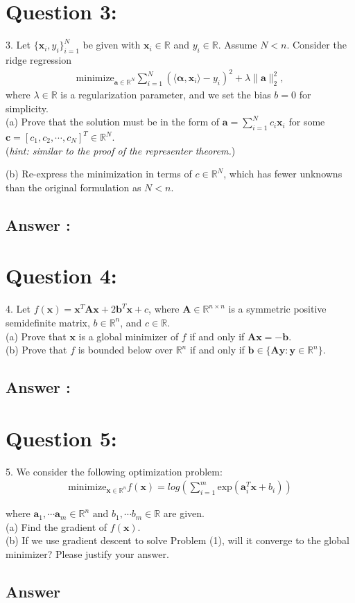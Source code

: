\documentclass[a4paper,12pt]{article}
\newcommand{\R}{\mathbb{R}}
\begin{document}
\section*{Question 3:}
3. Let \(\{\bm{x}_i, y_i\}_{i = 1}^N\) be given with \(\bm{x}_i \in \R\) and \(y_i \in \R\). Assume \(N < n\). Consider the ridge regression
\begin{align*}
    \text{minimize}_{\bm{a}\in\R^N} \sum_{i = 1}^N (\langle \bm{\alpha}, \bm{x}_i\rangle - y_i)^2 + \lambda\|\bm{a}\|_2^2,
\end{align*}
where \(\lambda \in \R\) is a regularization parameter, and we set the bias \(b = 0\) for simplicity. \\

(a) Prove that the solution must be in the form of \(\bm{a} = \sum_{i = 1}^N c_i \bm{x}_i\) for some \(\bm{c} = [c_1, c_2, \cdots, c_N]^T \in \R^N\). \\
(\textit{hint: similar to the proof of the representer theorem.})

(b) Re-express the minimization in terms of \(c \in \R^N\), which has fewer unknowns than the original formulation as \(N < n\).


\subsection*{Answer :}
\section*{Question 4:}
4. Let \(f(\bm{x}) = \bm{x}^T\bm{A}\bm{x} + 2\bm{b}^T\bm{x} + c\), where \(\bm{A} \in \R^{n \times n}\) is a symmetric positive semidefinite matrix, \(b \in \R^n\), and \(c \in \R\). \\
(a) Prove that \(\bm{x}\) is a global minimizer of \(f\) if and only if \(\bm{A}\bm{x} = -\bm{b}\). \\
(b) Prove that \(f\) is bounded below over \(\R^n\) if and only if \(\bm{b} \in \{\bm{A}\bm{y}: \bm{y} \in \R^n\}\). \\
\subsection*{Answer :}

\section*{Question 5:}
5. We consider the following optimization problem:
\begin{align}
    \text{minimize}_{\bm{x} \in \R^n} f(\bm{x}) = log\left( \sum_{i = 1}^m \text{exp}(\bm{a}_i^T \bm{x} + b_i)\right)
\end{align}

where \(\bm{a}_1, \cdots \bm{a}_m \in \R^n \text{ and } b_1, \cdots b_m \in \R\) are given. \\

(a) Find the gradient of \(f(\bm{x})\). \\
(b) If we use gradient descent to solve Problem (1), will it converge to the global minimizer? Please justify your answer.


\subsection*{Answer}
\end{document}
